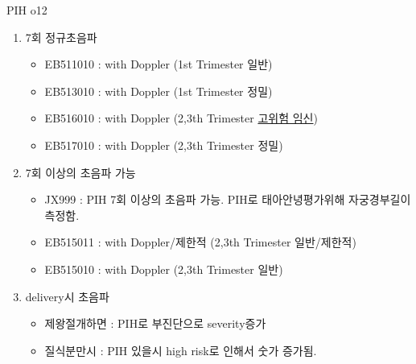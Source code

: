 \par
\medskip
\begin{commentbox}{PIH o12}
\begin{enumerate}\tightlist
\item 7회 정규초음파
	\begin{itemize}\tightlist
	\item EB511010 : with Doppler (1st Trimester 일반) 
	\item EB513010 : with Doppler (1st Trimester 정밀) 
	\item EB516010 : with Doppler (2,3th Trimester \uline{고위험 임신}) 
	\item EB517010 : with Doppler (2,3th Trimester 정밀) 
	\end{itemize}
\item 7회 이상의 초음파 가능
	\begin{itemize}\tightlist
	\item JX999 : PIH 7회 이상의 초음파 가능. PIH로 태아안녕평가위해 자궁경부길이 측정함.
	\item EB515011 : with Doppler/제한적 (2,3th Trimester 일반/제한적)
	\item EB515010 : with Doppler (2,3th Trimester 일반)
	\end{itemize}	
\item delivery시 초음파
	\begin{itemize}\tightlist
	\item 제왕절개하면 : PIH로 부진단으로 severity증가
	\item 질식분만시 : PIH 있을시 high risk로 인해서 숫가 증가됨.
	\end{itemize}
\end{enumerate}
\end{commentbox}
\par
\clearpage
